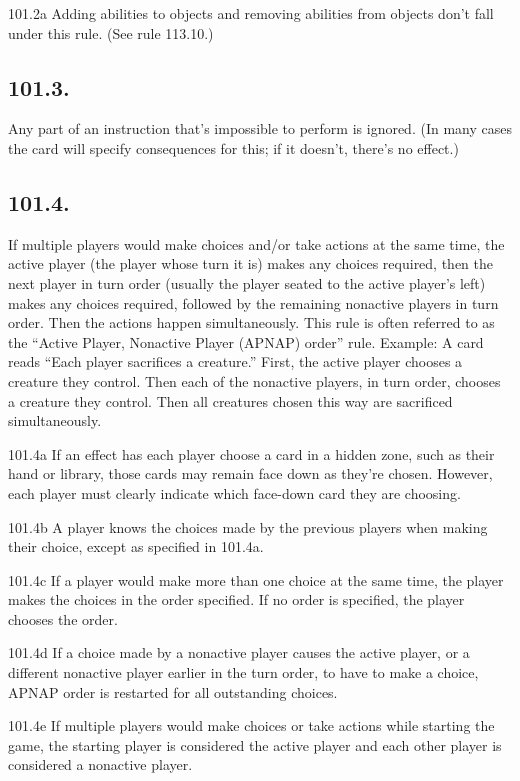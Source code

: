 101.2a Adding abilities to objects and removing abilities from objects don’t fall under this rule. (See rule 113.10.)

\subsection*{101.3.}
Any part of an instruction that’s impossible to perform is ignored. (In many cases the card will specify consequences for this; if it doesn’t, there’s no effect.)

\subsection*{101.4.}
If multiple players would make choices and/or take actions at the same time, the active player (the player whose turn it is) makes any choices required, then the next player in turn order (usually the player seated to the active player’s left) makes any choices required, followed by the remaining nonactive players in turn order. Then the actions happen simultaneously. This rule is often referred to as the “Active Player, Nonactive Player (APNAP) order” rule.
Example: A card reads “Each player sacrifices a creature.” First, the active player chooses a creature they control. Then each of the nonactive players, in turn order, chooses a creature they control. Then all creatures chosen this way are sacrificed simultaneously.

101.4a If an effect has each player choose a card in a hidden zone, such as their hand or library, those cards may remain face down as they’re chosen. However, each player must clearly indicate which face-down card they are choosing.

101.4b A player knows the choices made by the previous players when making their choice, except as specified in 101.4a.

101.4c If a player would make more than one choice at the same time, the player makes the choices in the order specified. If no order is specified, the player chooses the order.

101.4d If a choice made by a nonactive player causes the active player, or a different nonactive player earlier in the turn order, to have to make a choice, APNAP order is restarted for all outstanding choices.

101.4e If multiple players would make choices or take actions while starting the game, the starting player is considered the active player and each other player is considered a nonactive player.

